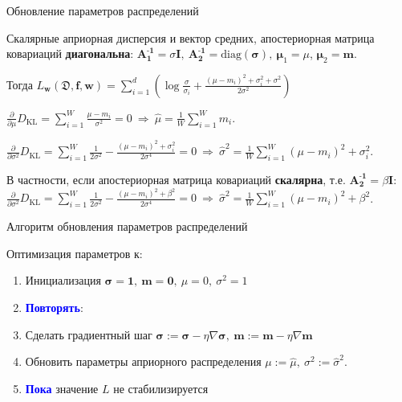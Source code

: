 \documentclass{beamer}
\newcommand{\DD}{{\mathfrak{D}}}
\newcommand{\bw}{{\textbf{w}}}
\newcommand{\II}{{\textbf{I}}}
\newcommand{\bbf}{{\textbf{f}}}
\newcommand{\bm}{{\textbf{m}}}
\newcommand{\bs}{{\boldsymbol{\sigma}}}
\newcommand{\bAo}{\mathbf{A^\text{-1}_\text{1}}}
\newcommand{\bAt}{\mathbf{A^\text{-1}_\text{2}}}
\newcommand{\bmuo}{{\boldsymbol{\mu}_1}}
\newcommand{\bmut}{{\boldsymbol{\mu}_2}}
\newcommand{\DKL}{\mathit{D}_{\text{KL}}}
\begin{document}
\begin{frame}{Обновление параметров распределений}

Скалярные априорная дисперсия и вектор средних, апостериорная матрица ковариаций \textbf{диагональна}: $\bAo = \sigma\II, \ \bAt = \text{diag}(\bs), \ \bmuo = \mu$, $\bmut = \bm$.

Тогда $L_\bw(\DD,\bbf,\bw) = \sum\limits_{i=1}^d(\log\frac{\sigma}{\sigma_i} + \frac{(\mu-m_i)^2 + \sigma_i^2 + \sigma^2}{2\sigma^2})$

$\frac\partial{\partial\mu}\DKL = \sum\limits_{i=1}^W\frac{\mu-m_i}{\sigma^2}=0 \ \Rightarrow \ \hat{\mu} = \frac1W\sum\limits_{i=1}^W m_i$.

$\frac\partial{\partial\sigma^2}\DKL = \sum\limits_{i=1}^W \frac1{2\sigma^2}-\frac{(\mu-m_i)^2 + \sigma_i^2}{2\sigma^4}=0 \ \Rightarrow \ \hat{\sigma}^2 = \frac1W\sum\limits_{i=1}^W (\mu-m_i)^2 + \sigma_i^2$.

\begin{block}{}
В частности, если апостериорная матрица ковариаций \textbf{скалярна}, т.е. $\bAt = \beta \II$:
$\frac\partial{\partial\sigma^2}\DKL = \sum\limits_{i=1}^W \frac1{2\sigma^2}-\frac{(\mu-m_i)^2 + \beta^2}{2\sigma^4}=0 \ \Rightarrow \ \hat{\sigma}^2 = \frac1W\sum\limits_{i=1}^W (\mu-m_i)^2 + \beta^2$.
\end{block}


\end{frame}

\begin{frame}{Алгоритм обновления параметров распределений}

Оптимизация параметров к:

\begin{enumerate}
	\item Инициализация $\bs = \textbf{1}, \ \bm = \textbf{0}, \ \mu = 0, \ \sigma^2 = 1$
	
	\item \textcolor{blue}{\textbf{Повторять}}:
	
	\item Сделать градиентный шаг $\bs:=\bs-\eta\nabla\bs, \ \bm:=\bm-\eta\nabla\bm$
	
	\item Обновить параметры априорного распределения $\mu:= \hat{\mu}, \ \sigma^2:=\hat{\sigma}^2$.
	
	\item \textcolor{blue}{\textbf{Пока}} значение $L$ не стабилизируется
	

\end{enumerate}

\end{frame}
\end{document}
